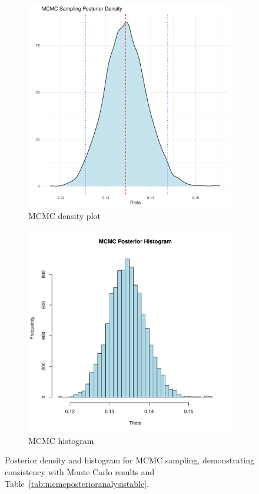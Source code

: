 \documentclass[12pt,a4paper]{article}
\begin{document}
\begin{figure}[!ht]
    \centering
    \begin{subfigure}{0.49\textwidth}
        \includegraphics[width=\textwidth]{figures/mcmc_posterior_density_plot.pdf}
        \caption{MCMC density plot}\label{fig:mcmcposteriordensityplot}
    \end{subfigure}
    \begin{subfigure}{0.49\textwidth}
        \includegraphics[width=\textwidth]{figures/mcmc_posterior_histogram.pdf}
        \caption{MCMC histogram}\label{fig:mcmcposteriorhistogram}
    \end{subfigure}
    \caption{Posterior density and histogram for MCMC sampling, demonstrating consistency with Monte Carlo
    results and Table~\ref{tab:mcmcposterioranalysistable}.}\label{fig:mcmcposterior}
\end{figure}
\end{document}
